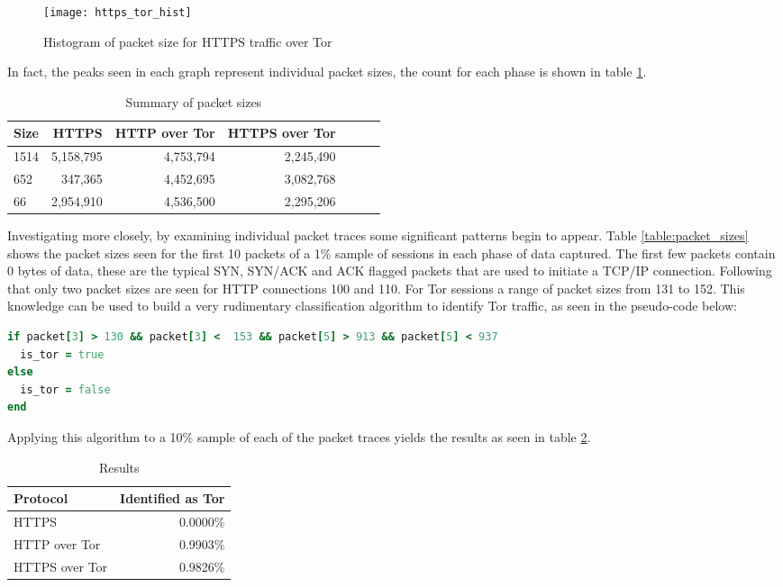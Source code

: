 \begin{figure}[H]
  \centering\texttt{[image: https\_tor\_hist]}
  \caption{Histogram of packet size for HTTPS traffic over Tor}
  \label{https_tor_hist}
\end{figure}

In fact, the peaks seen in each graph represent individual packet sizes, the
count for each phase is shown in table \ref{table:packet_size_summary}.

\begin{table}[H]
  \begin{tabular}{lrrrrrr}
    \toprule
    Size & HTTPS & HTTP over Tor & HTTPS over Tor \\
    \midrule
    1514 & 5,158,795 & 4,753,794 & 2,245,490\\
    652 & 347,365 & 4,452,695 & 3,082,768\\
    66 & 2,954,910 & 4,536,500 & 2,295,206\\
    \bottomrule
  \end{tabular}
  \caption{Summary of packet sizes}
  \label{table:packet_size_summary}
\end{table}

Investigating more closely, by examining individual packet traces some
significant patterns begin to appear. Table \ref{table:packet_sizes} shows the
packet sizes seen for the first 10 packets of a 1\% sample of sessions in each
phase of data captured. The first few packets contain 0 bytes of data, these
are the typical SYN, SYN/ACK and ACK flagged packets that are used to initiate
a TCP/IP connection. Following that only two packet sizes are seen for HTTP
connections 100 and 110. For Tor sessions a range of packet sizes from 131 to
152. This knowledge can be used to build a very rudimentary classification
algorithm to identify Tor traffic, as seen in the pseudo-code below:

\begin{lstlisting}[language=ruby]
if packet[3] > 130 && packet[3] <  153 && packet[5] > 913 && packet[5] < 937
  is_tor = true
else
  is_tor = false
end
\end{lstlisting}

Applying this algorithm to a 10\% sample of each of the packet traces yields
the results as seen in table \ref{table:heuristic-results}.

\begin{table}[H]
  \begin{tabular}{lr}
    \toprule
    Protocol & Identified as Tor\\
    \midrule
    HTTPS & 0.0000\% \\
    HTTP over Tor & 0.9903\% \\
    HTTPS over Tor & 0.9826\% \\
    \bottomrule
  \end{tabular}
  \caption{Results}
  \label{table:heuristic-results}
\end{table}

